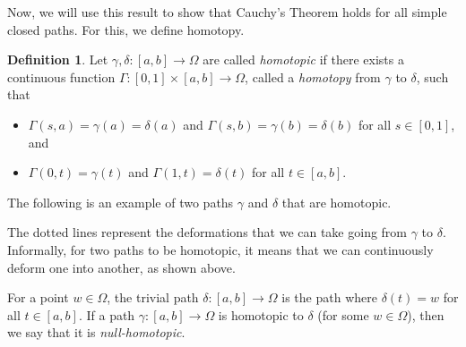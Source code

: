 \documentclass[a4paper, openany]{memoir}
\theoremstyle{definition}
\newtheorem{definition}{Definition}[section]
\theoremstyle{plain}
\begin{document}
Now, we will use this result to show that Cauchy's Theorem holds for all simple closed paths. For this, we define homotopy.
\begin{definition}
Let $\gamma, \delta: [a, b] \to \Omega$ are called \emph{homotopic} if there exists a continuous function $\Gamma: [0, 1] \times [a, b] \to \Omega$, called a \emph{homotopy} from $\gamma$ to $\delta$, such that
\begin{itemize}
    \item $\Gamma(s, a) = \gamma(a) = \delta(a)$ and $\Gamma(s, b) = \gamma(b) = \delta(b)$ for all $s \in [0, 1]$, and
    \item $\Gamma(0, t) = \gamma(t)$ and $\Gamma(1, t) = \delta(t)$ for all $t \in [a, b]$.
\end{itemize}
\end{definition}
\noindent The following is an example of two paths $\gamma$ and $\delta$ that are homotopic.
\begin{figure}[H]
    \centering
\end{figure}
\noindent The dotted lines represent the deformations that we can take going from $\gamma$ to $\delta$. Informally, for two paths to be homotopic, it means that we can continuously deform one into another, as shown above.

For a point $w \in \Omega$, the trivial path $\delta: [a, b] \to \Omega$ is the path where $\delta(t) = w$ for all $t \in [a, b]$. If a path $\gamma: [a, b] \to \Omega$ is homotopic to $\delta$ (for some $w \in \Omega$), then we say that it is \emph{null-homotopic}.
\end{document}

